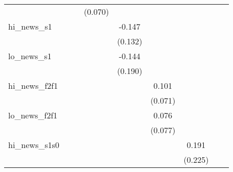{\begin{tabular}{l*{8}{c}}
            &                     &                     &     (0.070)         &                     &                     &                     &                     &                     \\
\addlinespace
hi\_news\_s1  &                     &                     &                     &      -0.147         &                     &                     &                     &                     \\
            &                     &                     &                     &     (0.132)         &                     &                     &                     &                     \\
\addlinespace
lo\_news\_s1  &                     &                     &                     &      -0.144         &                     &                     &                     &                     \\
            &                     &                     &                     &     (0.190)         &                     &                     &                     &                     \\
\addlinespace
hi\_news\_f2f1&                     &                     &                     &                     &       0.101         &                     &                     &                     \\
            &                     &                     &                     &                     &     (0.071)         &                     &                     &                     \\
\addlinespace
lo\_news\_f2f1&                     &                     &                     &                     &       0.076         &                     &                     &                     \\
            &                     &                     &                     &                     &     (0.077)         &                     &                     &                     \\
\addlinespace
hi\_news\_s1s0&                     &                     &                     &                     &                     &       0.191         &                     &                     \\
            &                     &                     &                     &                     &                     &     (0.225)         &                     &                     \\

\end{tabular}}
